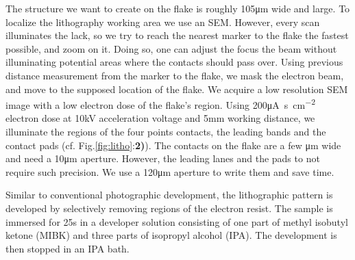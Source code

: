\documentclass[../main.tex]{subfiles}
\begin{document}
    The structure we want to create on the flake is roughly 105\si{\micro\meter} wide and large. To localize the lithography working area we use an SEM. However, every scan illuminates the lack,
    so we try to reach the nearest marker to the flake the fastest possible, and zoom on it. Doing so, one can adjust the focus the beam without illuminating potential areas where the contacts
    should pass over.  Using previous distance measurement from the marker to the flake, we mask the electron beam, and move to the supposed location of the flake. 
    We acquire a low resolution SEM image with a low electron dose of the flake's region. Using 200\si{\micro\ampere\second\per\square\centi\meter} electron dose at 10\si{\kilo\volt} acceleration voltage
    and 5\si{\milli\meter} working distance, we illuminate the regions of the four points contacts, the leading bands and the contact pads (cf. Fig.\ref{fig:litho}:\textbf{2)}).
    The contacts on the flake are a few \si{\micro\meter} wide and need a 10\si{\micro\meter} aperture. However, the leading lanes and the pads to not require such precision. We use 
    a 120\si{\micro\meter} aperture to write them and save time.

    Similar to conventional photographic development, the lithographic pattern is developed by selectively removing regions of the electron resist. The sample is immersed 
    for 25s in a developer solution consisting of one part of methyl isobutyl  ketone (MIBK) and three parts of isopropyl alcohol (IPA). The development is then stopped in an IPA bath.
\end{document}
